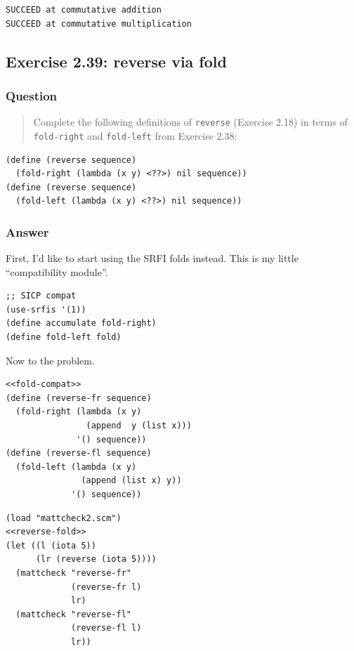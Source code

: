 \documentclass[final,fleqn,titlepage,twoside]{article}
\begin{document}
\begin{verbatim}
SUCCEED at commutative addition
SUCCEED at commutative multiplication
\end{verbatim}

\subsection{Exercise 2.39: reverse via fold}
\label{sec:org4f8b0af}
\subsubsection{Question}
\label{sec:org08032bf}
\begin{quote}
Complete the following
definitions of \texttt{reverse} (Exercise 2.18) in terms of
\texttt{fold-right} and \texttt{fold-left} from Exercise 2.38:
\end{quote}

\begin{verbatim}
(define (reverse sequence)
  (fold-right (lambda (x y) <??>) nil sequence))
(define (reverse sequence)
  (fold-left (lambda (x y) <??>) nil sequence))
\end{verbatim}

\subsubsection{Answer}
\label{sec:orgb3644f9}
First, I'd like to start using the SRFI folds instead. This is my little ``compatibility module''.

\begin{verbatim}
;; SICP compat
(use-srfis '(1))
(define accumulate fold-right)
(define fold-left fold)
\end{verbatim}

Now to the problem.

\begin{verbatim}
<<fold-compat>>
(define (reverse-fr sequence)
  (fold-right (lambda (x y)
                (append  y (list x)))
              '() sequence))
(define (reverse-fl sequence)
  (fold-left (lambda (x y)
               (append (list x) y))
             '() sequence))
\end{verbatim}
\begin{verbatim}
(load "mattcheck2.scm")
<<reverse-fold>>
(let ((l (iota 5))
      (lr (reverse (iota 5))))
  (mattcheck "reverse-fr"
             (reverse-fr l)
             lr)
  (mattcheck "reverse-fl"
             (reverse-fl l)
             lr))
\end{verbatim}
\end{document}
